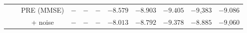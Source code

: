 \begin{table}[!t]
\begin{minipage}{1\textwidth}
\begin{tabular}{ccccccccccc}
                    && PRE (MMSE)
                    & $-$ & $-$ & $-$ & $-8.579$ & $-8.903$ & $\mathbf{-9.405}$ & $\underline{-9.383}$ & $-9.086$  \\
                    && + noise
                    & $-$ & $-$ & $-$ & $-8.013$ & $-8.792$ & $\mathbf{-9.378}$ & $-8.885$ & $\underline{-9.060}$  \\ 
        \bottomrule
        \end{tabular}
        \\ \vspace*{1mm} 
        \small
        \raggedright
    \end{minipage}
    \vspace*{-4mm}
\end{table}